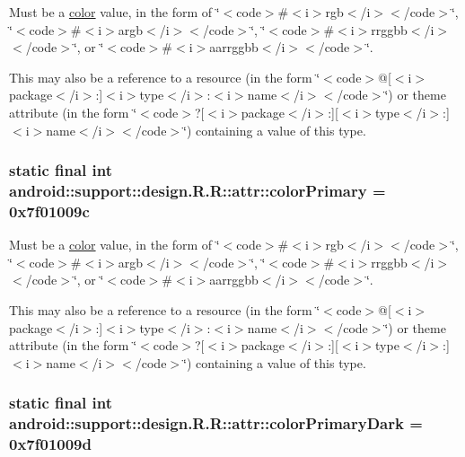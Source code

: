 Must be a \hyperlink{classandroid_1_1support_1_1design_1_1_r_1_1color}{color} value, in the form of \char`\"{}$<$code$>$\#$<$i$>$rgb$<$/i$>$$<$/code$>$\char`\"{}, \char`\"{}$<$code$>$\#$<$i$>$argb$<$/i$>$$<$/code$>$\char`\"{}, \char`\"{}$<$code$>$\#$<$i$>$rrggbb$<$/i$>$$<$/code$>$\char`\"{}, or \char`\"{}$<$code$>$\#$<$i$>$aarrggbb$<$/i$>$$<$/code$>$\char`\"{}. 

This may also be a reference to a resource (in the form \char`\"{}$<$code$>$@\mbox{[}$<$i$>$package$<$/i$>$:\mbox{]}$<$i$>$type$<$/i$>$:$<$i$>$name$<$/i$>$$<$/code$>$\char`\"{}) or theme attribute (in the form \char`\"{}$<$code$>$?\mbox{[}$<$i$>$package$<$/i$>$:\mbox{]}\mbox{[}$<$i$>$type$<$/i$>$:\mbox{]}$<$i$>$name$<$/i$>$$<$/code$>$\char`\"{}) containing a value of this type. \hypertarget{classandroid_1_1support_1_1design_1_1_r_1_1attr_2465c060c3dddf0601dbd3cf4351ae5d}{
\subsubsection[{colorPrimary}]{\setlength{\rightskip}{0pt plus 5cm}static final int android::support::design.R.R::attr::colorPrimary = 0x7f01009c}}
\label{classandroid_1_1support_1_1design_1_1_r_1_1attr_2465c060c3dddf0601dbd3cf4351ae5d}


Must be a \hyperlink{classandroid_1_1support_1_1design_1_1_r_1_1color}{color} value, in the form of \char`\"{}$<$code$>$\#$<$i$>$rgb$<$/i$>$$<$/code$>$\char`\"{}, \char`\"{}$<$code$>$\#$<$i$>$argb$<$/i$>$$<$/code$>$\char`\"{}, \char`\"{}$<$code$>$\#$<$i$>$rrggbb$<$/i$>$$<$/code$>$\char`\"{}, or \char`\"{}$<$code$>$\#$<$i$>$aarrggbb$<$/i$>$$<$/code$>$\char`\"{}. 

This may also be a reference to a resource (in the form \char`\"{}$<$code$>$@\mbox{[}$<$i$>$package$<$/i$>$:\mbox{]}$<$i$>$type$<$/i$>$:$<$i$>$name$<$/i$>$$<$/code$>$\char`\"{}) or theme attribute (in the form \char`\"{}$<$code$>$?\mbox{[}$<$i$>$package$<$/i$>$:\mbox{]}\mbox{[}$<$i$>$type$<$/i$>$:\mbox{]}$<$i$>$name$<$/i$>$$<$/code$>$\char`\"{}) containing a value of this type. \hypertarget{classandroid_1_1support_1_1design_1_1_r_1_1attr_09f850fcfcb6c89b9739964aa8622c80}{
\subsubsection[{colorPrimaryDark}]{\setlength{\rightskip}{0pt plus 5cm}static final int android::support::design.R.R::attr::colorPrimaryDark = 0x7f01009d}}
\label{classandroid_1_1support_1_1design_1_1_r_1_1attr_09f850fcfcb6c89b9739964aa8622c80}


